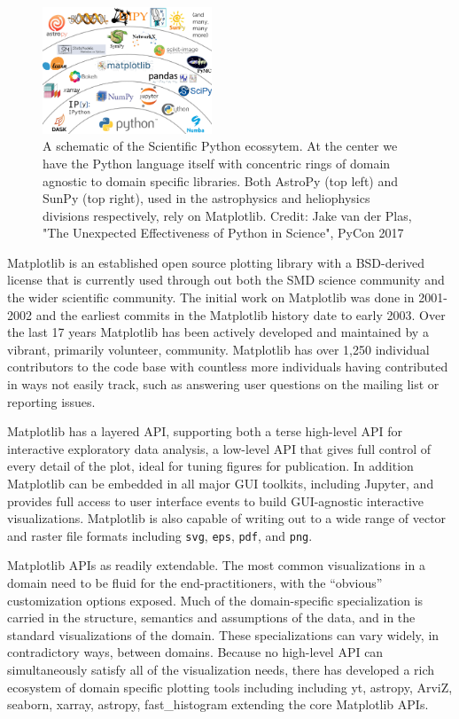\documentclass[12pt]{article}
\numberwithin{page}{section}
\begin{document}
\begin{figure}
  \includegraphics[width=0.45\textwidth]{scipy-ecosystem}
  \caption{A schematic of the Scientific Python ecossytem.  At the
    center we have the Python language itself with concentric rings of
    domain agnostic to domain specific libraries.  Both AstroPy (top
    left) and SunPy (top right), used in the astrophysics and
    heliophysics divisions respectively, rely on Matplotlib.
    Credit: Jake van der Plas, "The Unexpected Effectiveness of Python
    in Science", PyCon 2017}
  \label{fig:ecosystem}
\end{figure}



Matplotlib \cite{Hunter:2007} is an established open source plotting
library with a BSD-derived license that is currently used through out
both the SMD science community and the wider scientific community.
The initial work on Matplotlib was done in 2001-2002 and the earliest
commits in the Matplotlib history date to early 2003.  Over the last
17 years Matplotlib has been actively developed and maintained by a
vibrant, primarily volunteer, community.  Matplotlib has over 1,250
individual contributors to the code base with countless more
individuals having contributed in ways not easily track, such as
answering user questions on the mailing list or reporting issues.

Matplotlib has a layered API, supporting both a terse high-level API
for interactive exploratory data analysis, a low-level API that gives
full control of every detail of the plot, ideal for tuning figures for
publication.  In addition Matplotlib can be embedded in all major GUI
toolkits, including Jupyter, and provides full access to user
interface events to build GUI-agnostic interactive visualizations.
Matplotlib is also capable of writing out to a wide range of vector
and raster file formats including \texttt{svg}, \texttt{eps},
\texttt{pdf}, and \texttt{png}.

Matplotlib APIs as readily extendable.  The most common visualizations
in a domain need to be fluid for the end-practitioners, with the
``obvious'' customization options exposed. Much of the domain-specific
specialization is carried in the structure, semantics and assumptions
of the data, and in the standard visualizations of the domain. These
specializations can vary widely, in contradictory ways, between
domains. Because no high-level API can simultaneously satisfy all of
the visualization needs, there has developed a rich ecosystem of
domain specific plotting tools including including yt, astropy, ArviZ,
seaborn, xarray, astropy, fast\_histogram extending the core
Matplotlib APIs.
\end{document}
